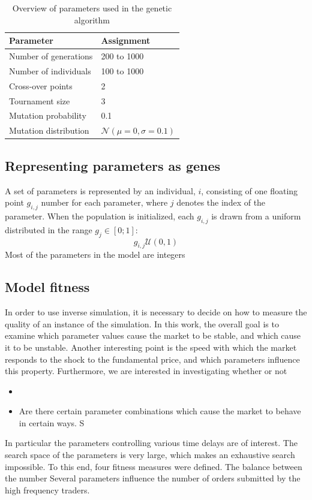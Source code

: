 \begin{table}
	\centering
	\begin{tabular}{l|l}
		Parameter & Assignment\\\hline
		Number of generations & 200 to 1000\\
		Number of individuals & 100 to 1000\\
		Cross-over points & 2\\
		Tournament size & 3\\
		Mutation probability & 0.1\\
		Mutation distribution &  $\mathcal{N}(\mu = 0, \sigma = 0.1)$\\
	\end{tabular}
	\caption{Overview of parameters used in the genetic algorithm}
	\label{table:genetic_algorithm_parameters}
\end{table}

\subsection{Representing parameters as genes}
A set of parameters is represented by an individual, $i$, consisting of one floating point $g_{i,j}$ number for each parameter, where $j$ denotes the index of the parameter. When the population is initialized, each $g_{i,j}$ is drawn from a uniform distributed in the range $g_j \in [0;1]$:
\begin{equation}
g_{i,j} \mathcal{U}(0,1)
\end{equation}
Most of the parameters in the model are integers



\subsection{Model fitness}\label{section:simulation_fitness}

In order to use inverse simulation, it is necessary to decide on how to measure the quality of an instance of the simulation. 
In this work, the overall goal is to examine which parameter values cause the market to be stable, and which cause it to be unstable. 
Another interesting point is the speed with which the market responds to the shock to the fundamental price, and which parameters influence this property. Furthermore, we are interested in investigating whether or not 

\begin{itemize}
\item 
\item Are there certain parameter combinations which cause the market to behave in certain ways. S
\end{itemize}
In particular the parameters controlling various time delays are of interest. 
The search space of the parameters is very large, which makes an exhaustive search impossible.
To this end, four fitness measures were defined.
The balance between the number 
Several parameters influence the number of orders submitted by the high frequency traders.



